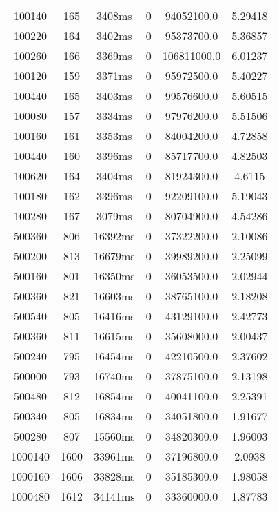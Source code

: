 \documentclass[./main.tex]{subfiles}
\begin{document}
\begin{table}
\begin{tabular}{ c | c | c | c | c | c }
        \hline
        \rowcolor{lightgray} 100140 & 165 & 3408ms & 0 & 94052100.0 & 5.29418 \\
        100220 & 164 & 3402ms & 0 & 95373700.0 & 5.36857 \\
        100260 & 166 & 3369ms & 0 & 106811000.0 & 6.01237 \\
        100120 & 159 & 3371ms & 0 & 95972500.0 & 5.40227 \\
        100440 & 165 & 3403ms & 0 & 99576600.0 & 5.60515 \\
        100080 & 157 & 3334ms & 0 & 97976200.0 & 5.51506 \\
        100160 & 161 & 3353ms & 0 & 84004200.0 & 4.72858 \\
        100440 & 160 & 3396ms & 0 & 85717700.0 & 4.82503 \\
        100620 & 164 & 3404ms & 0 & 81924300.0 & 4.6115 \\
        100180 & 162 & 3396ms & 0 & 92209100.0 & 5.19043 \\
        100280 & 167 & 3079ms & 0 & 80704900.0 & 4.54286 \\
        \hline
        500360 & 806 & 16392ms & 0 & 37322200.0 & 2.10086 \\
        500200 & 813 & 16679ms & 0 & 39989200.0 & 2.25099 \\
        500160 & 801 & 16350ms & 0 & 36053500.0 & 2.02944 \\
        500360 & 821 & 16603ms & 0 & 38765100.0 & 2.18208 \\
        500540 & 805 & 16416ms & 0 & 43129100.0 & 2.42773 \\
        500360 & 811 & 16615ms & 0 & 35608000.0 & 2.00437 \\
        500240 & 795 & 16454ms & 0 & 42210500.0 & 2.37602 \\
        \rowcolor{lightgray} 500000 & 793 & 16740ms & 0 & 37875100.0 & 2.13198 \\
        500480 & 812 & 16854ms & 0 & 40041100.0 & 2.25391 \\
        500340 & 805 & 16834ms & 0 & 34051800.0 & 1.91677 \\
        500280 & 807 & 15560ms & 0 & 34820300.0 & 1.96003 \\
        \hline
        1000140 & 1600 & 33961ms & 0 & 37196800.0 & 2.0938 \\
        1000160 & 1606 & 33828ms & 0 & 35185300.0 & 1.98058 \\
        1000480 & 1612 & 34141ms & 0 & 33360000.0 & 1.87783 \\

\end{tabular}
\end{table}
\end{document}
